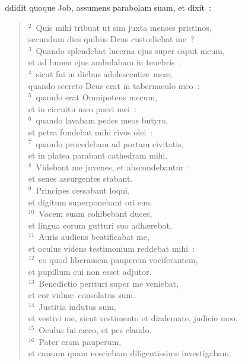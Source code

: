 \bchapter
{}ddidit quoque Job, assumens parabolam suam, et dixit~:
\begin{flushleft}\begin{verse}\vspace{6pt}${}^{2}$~Quis mihi tribuat ut sim juxta menses pristinos,\\ secundum dies quibus Deus custodiebat me~?\\
${}^{3}$~Quando splendebat lucerna ejus super caput meum,\\ et ad lumen ejus ambulabam in tenebris~:\\
${}^{4}$~sicut fui in diebus adolescenti\ae\ me\ae ,\\ quando secreto Deus erat in tabernaculo meo~:\\
${}^{5}$~quando erat Omnipotens mecum,\\ et in circuitu meo pueri mei~:\\
${}^{6}$~quando lavabam pedes meos butyro,\\ et petra fundebat mihi rivos olei~:\\
${}^{7}$~quando procedebam ad portam civitatis,\\ et in platea parabant cathedram mihi.\\
${}^{8}$~Videbant me juvenes, et abscondebantur~:\\ et senes assurgentes stabant.\\
${}^{9}$~Principes cessabant loqui,\\ et digitum superponebant ori suo.\\
${}^{10}$~Vocem suam cohibebant duces,\\ et lingua eorum gutturi suo adh\ae rebat.\\
${}^{11}$~Auris audiens beatificabat me,\\ et oculus videns testimonium reddebat mihi~:\\
${}^{12}$~eo quod liberassem pauperem vociferantem,\\ et pupillum cui non esset adjutor.\\
${}^{13}$~Benedictio perituri super me veniebat,\\ et cor vidu\ae\ consolatus sum.\\
${}^{14}$~Justitia indutus sum,\\ et vestivi me, sicut vestimento et diademate, judicio meo.\\
${}^{15}$~Oculus fui c\ae co, et pes claudo.\\
${}^{16}$~Pater eram pauperum,\\ et causam quam nesciebam diligentissime investigabam.\\

\end{verse}
\end{flushleft}
